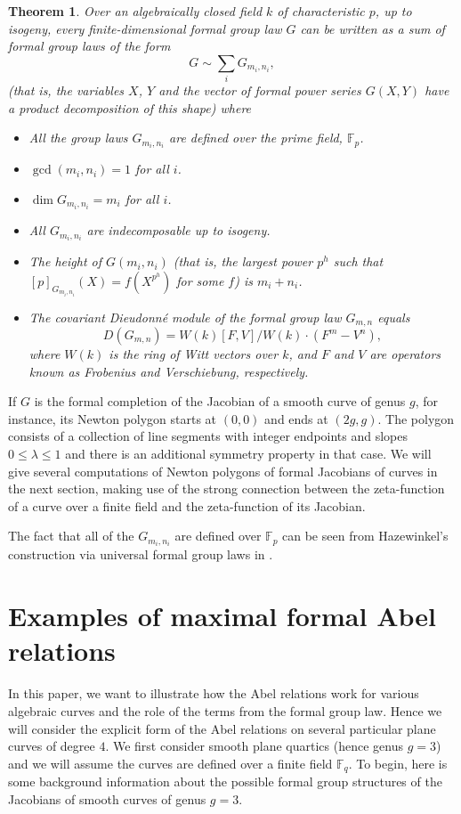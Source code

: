 \documentclass[12pt]{amsart}
\theoremstyle{theorem}
\newtheorem{thm}{Theorem}
\newcommand{\FF}{\mathbb{F}}
\begin{document}
\begin{thm}  
\label{DieudonneManin}
Over an algebraically closed field $k$ of characteristic $p$, up to isogeny,
every finite-dimensional formal group law $G$ can be written as a sum of formal group laws of the form
$$G \sim \sum_{i} G_{m_i, n_i},$$
(that is, the variables $X$, $Y$ and the vector of formal power series $G(X,Y)$ have a product decomposition
of this shape) where 
\begin{itemize}
\item All the group laws $G_{m_i,n_i}$ are defined over the prime field, $\FF_p$.
\item $\gcd(m_i, n_i) = 1$ for all $i$.
\item $\dim G_{m_i,n_i} = m_i$ for all $i$.
\item All $G_{m_i, n_i}$ are indecomposable up to isogeny.
\item The height of $G(m_i, n_i)$ (that is, the largest power $p^h$ such that $[p]_{G_{m_i,n_i}}(X) = f(X^{p^h})$ for some $f$) is $m_i + n_i$.
\item The covariant Dieudonn\'e module of the formal group law $G_{m,n}$ equals
$$D(G_{m,n}) =  W(k)[F,V]/W(k)\cdot (F^m - V^n),$$
where $W(k)$ is the ring of Witt vectors over $k$, and $F$ and $V$ are operators known as
\emph{Frobenius} and \emph{Verschiebung}, respectively.
\end{itemize}
\end{thm}

If $G$ is the formal completion of the Jacobian of a smooth curve of genus $g$, for instance, 
its Newton polygon starts at $(0,0)$ and ends at $(2g,g)$.  The polygon consists of a collection of 
line segments with integer endpoints and slopes $0 \le \lambda \le 1$ and there is an additional 
symmetry property in that case.  We will give several computations of Newton polygons
of formal Jacobians of curves in the next section, making use of the strong connection between the 
zeta-function of a curve over a finite field and the zeta-function of its Jacobian.


The fact that all of the $G_{m_i,n_i}$ are defined over $\FF_p$ can be seen from 
Hazewinkel's construction via universal formal group laws in \cite[(28.5.9)]{H}.
 
 \section{Examples of maximal formal Abel relations}
 
 In this paper, we want to illustrate how the Abel relations work for 
 various algebraic curves and the role of the terms from the formal group law.
 Hence we will consider the explicit form of the Abel relations on several particular plane
 curves of degree $4$.  We first consider smooth plane quartics (hence genus $g = 3$) and we 
 will assume the curves are defined over a finite field $\FF_q$.   To begin, here is some background information 
 about the possible formal group structures of the Jacobians of smooth curves of genus $g = 3$.  
 
\end{document}
